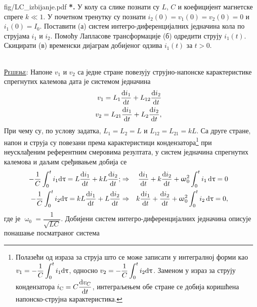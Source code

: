 \begin{slikaDesno}{fig/LC_izbijanje.pdf}
    \textbf{{\color{red}*}\ID.} 
    У колу са слике познати су 
    $L$, 
    $C$ и коефицијент магнетске спреге $k \ll 1$.
    У почетном тренутку су познати 
    $i_2(0) = v_1(0) = v_2(0) = 0$ и 
    $i_1(0) = I_0$. Поставити (а)
    систем 
    интегро-диференцијалних једначина кола 
    по струјама $i_1$ и $i_2$. Помоћу 
    Лапласове
    трансформације (б) одредити струју $i_1(t)$.
    Скицирати (в) временски дијаграм 
    добијеног одзива
    $i_1(t)$ за $t > 0$.
\end{slikaDesno} \\

\textsc{\underline{Решење}}:
Напоне $v_1$ и $v_2$ са једне стране повезују струјно-напонске карактеристике
спрегнутих калемова дата је системом једначина 
\begin{eqnarray}
    v_1 = L_1 \dfrac{{\rm d} i_1}{{\rm d} t} + L_{12} \dfrac{{\rm d} i_2}{{\rm d} t} \\
    v_2 = L_{21} \dfrac{{\rm d} i_1}{{\rm d} t} + L_{2} \dfrac{{\rm d} i_2}{{\rm d} t},
\end{eqnarray}
При чему су, по услову задатка, $L_1 = L_2 = L$ и $L_{12} = L_{21} = kL$. Са друге стране, 
напон и струја су повезани према карактеристици кондензатора\footnote{
Полазећи од израза за струја што се може записати у интегралној форми као 
$\displaystyle v_{\rm 1} = - \dfrac{1}{C} \int_{0}^{t} i_1 {\rm d} \uptau$, односно
$\displaystyle v_{\rm 2} = - \dfrac{1}{C} \int_{0}^{t} i_2 {\rm d} \uptau$.
Заменом у израз за струју кондензатора $i_{\rm C} = C \dfrac{{\rm d} v_C}{{\rm d} t}$, интеграљењем
обе стране се добија коришћена напонско-струјна карактеристика.
} при неусклађеним референтним 
смеровима резултата, у систем једначина спрегнутих калемова и даљим сређивањем добија се 
\begin{eqnarray}
    - \dfrac{1}{C} \int_{0}^{t} i_1 {\rm d} \uptau = L \dfrac{{\rm d} i_1}{{\rm d} t} + kL \dfrac{{\rm d} i_2}{{\rm d} t}; 
    & \Rightarrow & 
    \dfrac{{\rm d} i_1}{{\rm d} t} + k \dfrac{{\rm d} i_2}{{\rm d} t} + \upomega_0^2 \int_0^t i_1 \, {\rm d} \uptau = 0
    \\
    - \dfrac{1}{C} \int_{0}^{t} i_2 {\rm d} \uptau = kL \dfrac{{\rm d} i_1}{{\rm d} t} + L \dfrac{{\rm d} i_2}{{\rm d} t}
    & \Rightarrow &
    k \dfrac{{\rm d} i_1}{{\rm d} t} + \dfrac{{\rm d} i_2}{{\rm d} t} + \upomega_0^2 \int_0^t i_2 \, {\rm d} \uptau = 0,
\end{eqnarray}
где је $\upomega_0 = \dfrac{1}{\sqrt{LC}}$. Добијени систем интегро-диференцијалних једначина 
описује понашање посматраног система \\

